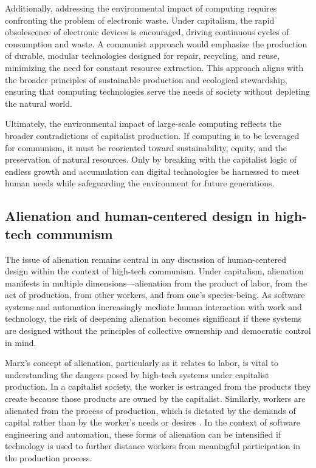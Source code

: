 \begin{refsection}
Additionally, addressing the environmental impact of computing requires confronting the problem of electronic waste. Under capitalism, the rapid obsolescence of electronic devices is encouraged, driving continuous cycles of consumption and waste. A communist approach would emphasize the production of durable, modular technologies designed for repair, recycling, and reuse, minimizing the need for constant resource extraction. This approach aligns with the broader principles of sustainable production and ecological stewardship, ensuring that computing technologies serve the needs of society without depleting the natural world.

Ultimately, the environmental impact of large-scale computing reflects the broader contradictions of capitalist production. If computing is to be leveraged for communism, it must be reoriented toward sustainability, equity, and the preservation of natural resources. Only by breaking with the capitalist logic of endless growth and accumulation can digital technologies be harnessed to meet human needs while safeguarding the environment for future generations.

\subsection{Alienation and human-centered design in high-tech communism}

The issue of alienation remains central in any discussion of human-centered design within the context of high-tech communism. Under capitalism, alienation manifests in multiple dimensions—alienation from the product of labor, from the act of production, from other workers, and from one's species-being. As software systems and automation increasingly mediate human interaction with work and technology, the risk of deepening alienation becomes significant if these systems are designed without the principles of collective ownership and democratic control in mind.

Marx's concept of alienation, particularly as it relates to labor, is vital to understanding the dangers posed by high-tech systems under capitalist production. In a capitalist society, the worker is estranged from the products they create because those products are owned by the capitalist. Similarly, workers are alienated from the process of production, which is dictated by the demands of capital rather than by the worker's needs or desires \cite[pp.~72]{marx_economic_philosophic}. In the context of software engineering and automation, these forms of alienation can be intensified if technology is used to further distance workers from meaningful participation in the production process.


\end{refsection}
